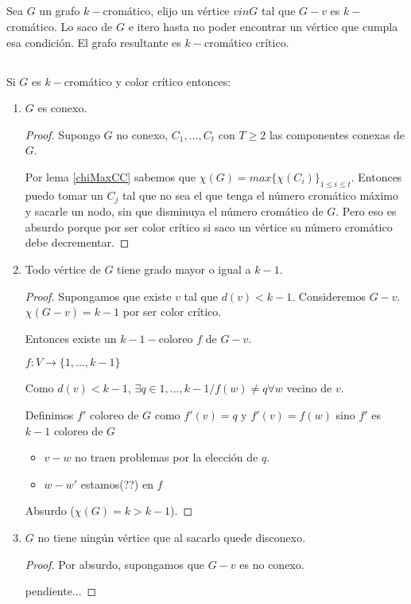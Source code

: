 \subsection{}
\setcounter{subsubsection}{1}
\subsubsection{}
Sea $G$ un grafo $k-$cromático, elijo un vértice $v in G$ tal que $G - v$ es $k-$cromático. Lo saco de $G$ e itero hasta no poder encontrar un vértice que cumpla esa condición. El grafo resultante es $k-$cromático crítico.

\subsection{}
Si $G$ es $k-$cromático y color crítico entonces:

\begin{enumerate}[label=\alph*)]
	\item {
		$G$ es conexo.

		\begin{proof}
			Supongo $G$ no conexo, $C_1, ..., C_t$ con $T \geq 2$ las componentes conexas de $G$. 

			Por lema \ref{chiMaxCC} sabemos que $\chi(G) = max \{\chi(C_i)\}_{1 \leq i \leq t}$. Entonces puedo tomar un $C_j$ tal que no sea el que tenga el número cromático máximo y sacarle un nodo, sin que disminuya el número cromático de $G$. Pero eso es absurdo porque por ser color crítico si saco un vértice su número cromático debe decrementar.
		\end{proof}
	}
	\item{
		Todo vértice de $G$ tiene grado mayor o igual a $k - 1$.

		\begin{proof}
			Supongamos que existe $v$ tal que $d(v) < k - 1$. Consideremos $G - v$. $\chi(G - v) = k - 1$ por ser color crítico.

			Entonces existe un $k-1-$coloreo $f$ de $G - v$.

			$f: V \longrightarrow \{1, ..., k - 1\}$

			Como $d(v) < k - 1$, $\exists q \in {1, ..., k - 1} / f(w) \not= q \forall w$ vecino de $v$.

			Definimos $f'$ coloreo de $G$ como $f'(v) = q$ y $f'(v) = f(w)$ sino $f'$ es $k - 1$ coloreo de $G$

			\begin{itemize}
				\item $v-w$ no traen problemas por la elección de $q$.
				\item $w-w'$ estamos(??) en $f$
			\end{itemize}

			Absurdo ($\chi(G) = k > k - 1$).
		\end{proof}
	}
	\item{
		$G$ no tiene ningún vértice que al sacarlo quede disconexo.

		\begin{proof}
			Por absurdo, supongamos que $G - v$ es no conexo.

			pendiente...
		\end{proof}
	}
\end{enumerate}


